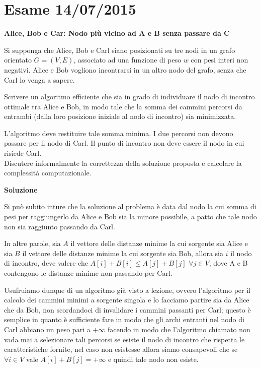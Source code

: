 \documentclass[../cheatSheetAlgoritmi.tex]{subfiles}
\begin{document}
\section{Esame 14/07/2015}
\textbf{Alice, Bob e Car: Nodo più vicino ad A e B senza passare da C} 

Si supponga che Alice, Bob e Carl siano posizionati su tre nodi in un grafo orientato $G= (V, E)$, associato ad una funzione di peso $w$ con pesi interi non negativi. Alice e Bob vogliono incontrarsi in un altro nodo del grafo, senza che Carl lo venga a sapere. 

Scrivere un algoritmo efficiente che sia in grado di individuare il nodo di incontro ottimale tra Alice e Bob, in modo tale che la somma dei cammini percorsi da entrambi (dalla loro posizione iniziale al nodo di incontro) sia minimizzata. 

L'algoritmo deve restituire tale somma minima. I due percorsi non devono passare per il nodo di Carl. Il punto di incontro non deve essere il nodo in cui risiede Carl. \\
Discutere informalmente la correttezza della soluzione proposta e calcolare la complessità computazionale. 

\textbf{Soluzione} 

Si può subito inture che la soluzione al problema è data dal nodo la cui somma di pesi per raggiungerlo da Alice e Bob sia la minore possibile, a patto che tale nodo non sia raggiunto passando da Carl. 

In altre parole, sia $A$ il vettore delle distanze minime la cui sorgente sia Alice e sia $B$ il vettore delle distanze minime la cui sorgente sia Bob, allora sia $i$ il nodo di incontro, deve valere che $A[i] + B[i] \leq A[j] + B[j]$ $ \forall j \in V$, dove A e B contengono le distanze minime non passando per Carl. 

Usufruiamo dunque di un algoritmo già visto a lezione, ovvero l'algoritmo per il calcolo dei cammini minimi a sorgente singola e lo facciamo partire sia da Alice che da Bob, non scordandoci di invalidare i cammini passanti per Carl; questo è semplice in quanto è sufficiente fare in modo che gli archi entranti nel nodo di Carl abbiano un peso pari a $+\infty$ facendo in modo che l'algoritmo chiamato non vada mai a selezionare tali percorsi se esiste il nodo di incontro che rispetta le caratteristiche fornite, nel caso non esistesse allora siamo consapevoli che se $\forall i \in V$ vale $A[i] + B[j] = +\infty$ e quindi tale nodo non esiste. 
\end{document}
